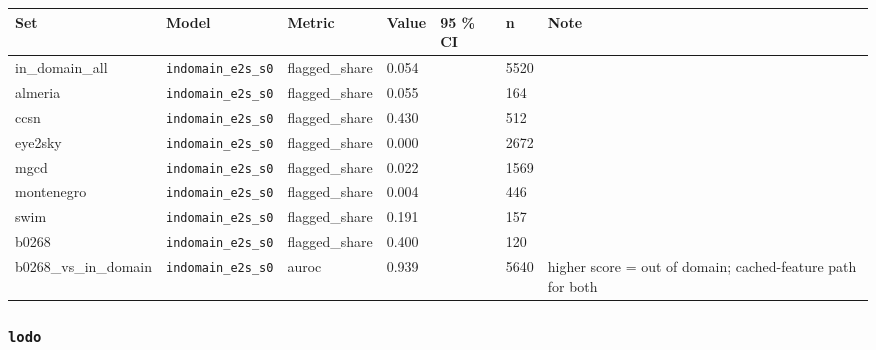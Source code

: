 \begin{center}{\scriptsize\setlength{\tabcolsep}{3pt}
\begin{tabular}{llllllp{8.7cm}}
\toprule
Set & Model & Metric & Value & 95 \% CI & n & Note \\
\midrule
in\_domain\_all & \texttt{indomain\_\allowbreak{}e2s\_\allowbreak{}s0} & flagged\_share & 0.054 &  & 5520 &  \\
almeria & \texttt{indomain\_\allowbreak{}e2s\_\allowbreak{}s0} & flagged\_share & 0.055 &  & 164 &  \\
ccsn & \texttt{indomain\_\allowbreak{}e2s\_\allowbreak{}s0} & flagged\_share & 0.430 &  & 512 &  \\
eye2sky & \texttt{indomain\_\allowbreak{}e2s\_\allowbreak{}s0} & flagged\_share & 0.000 &  & 2672 &  \\
mgcd & \texttt{indomain\_\allowbreak{}e2s\_\allowbreak{}s0} & flagged\_share & 0.022 &  & 1569 &  \\
montenegro & \texttt{indomain\_\allowbreak{}e2s\_\allowbreak{}s0} & flagged\_share & 0.004 &  & 446 &  \\
swim & \texttt{indomain\_\allowbreak{}e2s\_\allowbreak{}s0} & flagged\_share & 0.191 &  & 157 &  \\
b0268 & \texttt{indomain\_\allowbreak{}e2s\_\allowbreak{}s0} & flagged\_share & 0.400 &  & 120 &  \\
b0268\_vs\_in\_domain & \texttt{indomain\_\allowbreak{}e2s\_\allowbreak{}s0} & auroc & 0.939 &  & 5640 & higher score = out of domain; cached-feature path for both \\
\bottomrule
\end{tabular}}
\end{center}

\subsubsection{\texttt{lodo}}

